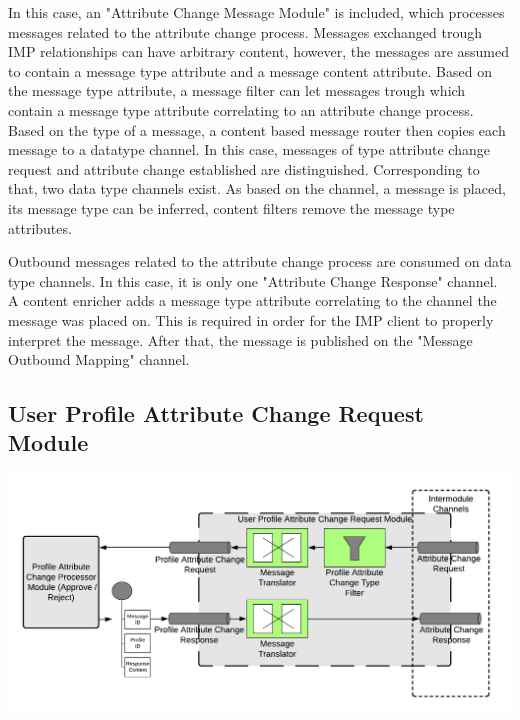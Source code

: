 In this case, an "Attribute Change Message Module" is included, which processes messages related to the attribute change process. Messages exchanged trough IMP relationships can have arbitrary content, however, the messages are assumed to contain a message type attribute and a message content attribute. Based on the message type attribute, a message filter can let messages trough which contain a message type attribute correlating to an attribute change process. Based on the type of a message, a content based message router then copies each message to a datatype channel. In this case, messages of type attribute change request and attribute change established are distinguished. Corresponding to that, two data type channels exist. As based on the channel, a message is placed, its message type can be inferred, content filters remove the message type attributes.

Outbound messages related to the attribute change process are consumed on data type channels. In this case, it is only one "Attribute Change Response" channel. A content enricher adds a message type attribute correlating to the channel the message was placed on. This is required in order for the IMP client to properly interpret the message. After that, the message is published on the "Message Outbound Mapping" channel.

\subsection{User Profile Attribute Change Request Module}

\begin{center}
    \includegraphics[scale=0.6]{Diagrams/Integration Architecture 1/Technological Integration/12. Attribute Change Request Module.pdf}
\end{center}

